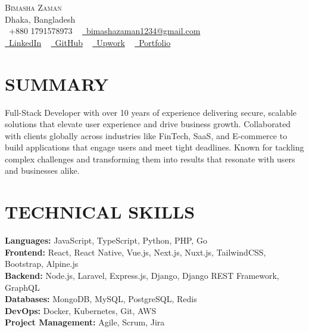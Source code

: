 \documentclass[letterpaper,11pt]{article}
\begin{document}
\begin{center}
    {\Huge \scshape Bimasha Zaman} \\ \vspace{1pt}
    Dhaka, Bangladesh \\ \vspace{3pt}
    \small 
    \faPhone\ +880 1791578973 ~
    \href{mailto:bimashazaman1234@gmail.com}{\faEnvelope\ bimashazaman1234@gmail.com} \\ \vspace{1pt}
    \href{https://linkedin.com/in/yourusername}{\faLinkedin\ LinkedIn} ~
    \href{https://github.com/yourusername}{\faGithub\ GitHub} ~
    \href{https://upwork.com/yourusername}{\faExternalLinkAlt\ Upwork} ~
    \href{https://yourportfolio.com}{\faGlobe\ Portfolio}
\end{center}

\section{ SUMMARY}
Full-Stack Developer with over 10 years of experience delivering secure, scalable solutions that elevate user experience and drive business growth. Collaborated with clients globally across industries like FinTech, SaaS, and E-commerce to build applications that engage users and meet tight deadlines. Known for tackling complex challenges and transforming them into results that resonate with users and businesses alike.

\section{TECHNICAL SKILLS}
\begin{itemize}[leftmargin=0.15in, label={}]
    \small{\item{
    \textbf{Languages:} JavaScript, TypeScript, Python, PHP, Go \\
    \textbf{Frontend:} React, React Native, Vue.js, Next.js, Nuxt.js, TailwindCSS, Bootstrap, Alpine.js \\
    \textbf{Backend:} Node.js, Laravel, Express.js, Django, Django REST Framework, GraphQL \\
    \textbf{Databases:} MongoDB, MySQL, PostgreSQL, Redis \\
    \textbf{DevOps:} Docker, Kubernetes, Git, AWS \\
    \textbf{Project Management:} Agile, Scrum, Jira
    }}
\end{itemize}
\end{document}
